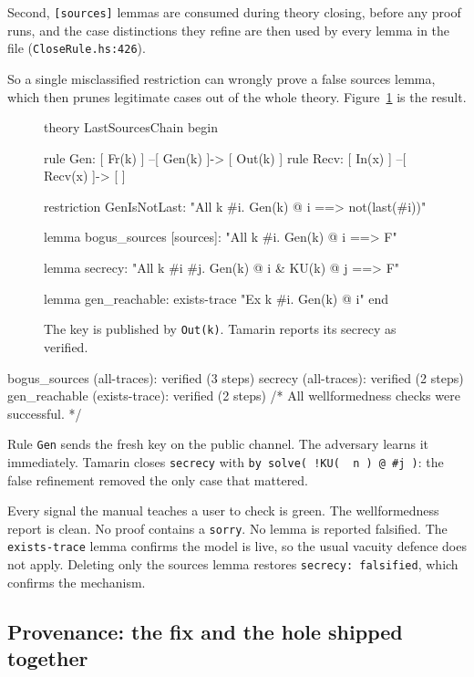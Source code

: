 \documentclass[version=preprint]{iacrcc}
\newcommand{\code}[1]{\texttt{\small #1}}
\newcommand{\tmc}[1]{\lstinline[style=tbase,language=TamarinL,
  backgroundcolor=\color{white},frame=none,basicstyle=\ttfamily\small]|#1|}
\theoremstyle{definition}
\theoremstyle{remark}
\begin{document}
Second, \code{[sources]} lemmas are consumed during theory closing, before any
proof runs, and the case distinctions they refine are then used by every lemma
in the file (\code{CloseRule.hs:426}).

So a single misclassified restriction can wrongly prove a false sources lemma,
which then prunes legitimate cases out of the whole theory.
Figure~\ref{fig:poc02} is the result.

\begin{figure}[t]
	\begin{tmlisting}
		theory LastSourcesChain begin

		rule Gen:  [ Fr(k) ] --[ Gen(k)  ]-> [ Out(k) ]
		rule Recv: [ In(x)  ] --[ Recv(x) ]-> [        ]

		restriction GenIsNotLast:
		"All k #i. Gen(k) @ i ==> not(last(#i))"

		lemma bogus_sources [sources]:
		"All k #i. Gen(k) @ i ==> F"

		lemma secrecy:
		"All k #i #j. Gen(k) @ i & KU(k) @ j ==> F"

		lemma gen_reachable: exists-trace
		"Ex k #i. Gen(k) @ i"
		end
	\end{tmlisting}
	\caption{The key is published by \tmc{Out(k)}. Tamarin reports its secrecy as
		verified.}\label{fig:poc02}
\end{figure}

\begin{outlisting}
	bogus_sources (all-traces):   verified (3 steps)
	secrecy       (all-traces):   verified (2 steps)
	gen_reachable (exists-trace): verified (2 steps)
	/* All wellformedness checks were successful. */
\end{outlisting}

Rule \code{Gen} sends the fresh key on the public channel. The adversary learns
it immediately. Tamarin closes \code{secrecy} with \code{by solve( !KU( ~n ) @
	\#j )}: the false refinement removed the only case that mattered.

Every signal the manual teaches a user to check is green. The wellformedness
report is clean. No proof contains a \code{sorry}. No lemma is reported
falsified. The \code{exists-trace} lemma confirms the model is live, so the
usual vacuity defence does not apply. Deleting only the sources lemma restores
\code{secrecy: falsified}, which confirms the mechanism.

\subsection{Provenance: the fix and the hole shipped together}\label{sec:provenance}
\end{document}
